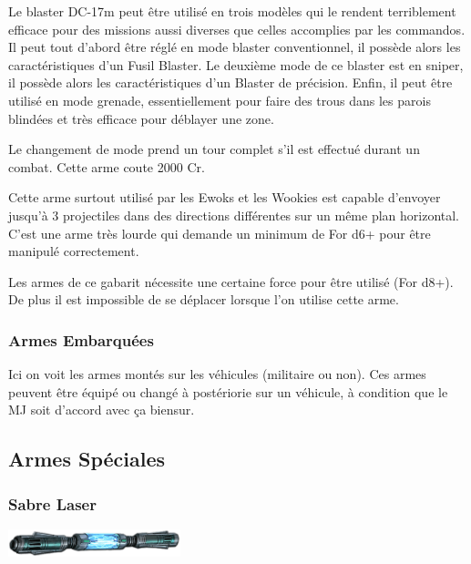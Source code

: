 \begin{description}[align=left]
    \item [Fusil Blaster DC-17m]
        Le blaster DC-17m peut être utilisé en trois modèles qui le rendent terriblement efficace pour des missions aussi diverses que celles accomplies par les commandos. Il peut tout d'abord être réglé en mode blaster conventionnel, il possède alors les caractéristiques d'un Fusil Blaster. Le deuxième mode de ce blaster est en sniper, il possède alors les caractéristiques d'un Blaster de précision. Enfin, il peut être utilisé en mode grenade, essentiellement pour faire des trous dans les parois blindées et très efficace pour déblayer une zone.

        Le changement de mode prend un tour complet s'il est effectué durant un combat. Cette arme coute 2000 Cr.

    \item [Arbalète Laser]
        Cette arme surtout utilisé par les Ewoks et les Wookies est capable d'envoyer jusqu'à 3 projectiles dans des directions différentes sur un même plan horizontal. C'est une arme très lourde qui demande un minimum de For d6+ pour être manipulé correctement.

    \item [Canon blaster rotatif]
        Les armes de ce gabarit nécessite une certaine force pour être utilisé (For d8+). De plus il est impossible de se déplacer lorsque l'on utilise cette arme.
\end{description}

\subsubsection{Armes Embarquées}
Ici on voit les armes montés sur les véhicules (militaire ou non). Ces armes peuvent être équipé ou changé à postériorie sur un véhicule, à condition que le MJ soit d'accord avec ça biensur.

\clearpage
\subsection{Armes Spéciales}

\subsubsection{Sabre Laser}
\label{sec:sabre-laser}

\begin{flushright}
	\vspace{-5\baselineskip}
	\includegraphics[width=5cm, angle=-25]{img/equipement/lightsaber01.png}
	\vspace{-1\baselineskip}
\end{flushright}

